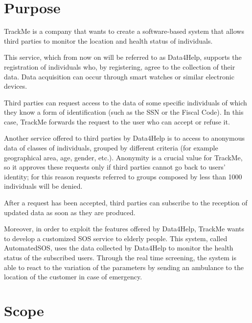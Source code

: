 \section{Purpose}
\cite{gps}TrackMe is a company that wants to create a software-based system that allows third parties to monitor the location and health status of individuals. 
\par This service, which from now on will be referred to as Data4Help, supports the registration of individuals who, by registering, agree to the collection of their data. Data acquisition can occur through smart watches or similar electronic devices.
\par Third parties can request access to the data of some specific individuals of which they know a form of identification (such as the SSN or the Fiscal Code). In this case, TrackMe forwards the request to the user who can accept or refuse it.
\par Another service offered to third parties by Data4Help is to access to anonymous data of classes of individuals, grouped by different criteria (for example geographical area, age, gender, etc.). Anonymity is a crucial value for TrackMe, so it approves these requests only if third parties cannot go back to users' identity; for this reason requests referred to groups composed by less than 1000 individuals will be denied.
\par After a request has been accepted, third parties can subscribe to the reception of updated data as soon as they are produced.
\par Moreover, in order to exploit the features offered by Data4Help, TrackMe wants to develop a customized SOS service to elderly people. This system, called AutomatedSOS, uses the data collected by Data4Help to monitor the health status of the subscribed users. Through the real time screening, the system is able to react to the variation of the parameters by sending an ambulance to the location of the customer in case of emergency.

\section{Scope}
